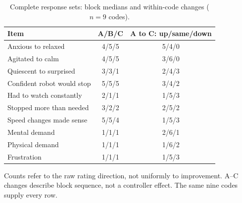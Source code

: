 \begin{table}[t]
\centering
\caption{Complete response sets: block medians and within-code changes ($n=9$ codes).}
\label{tab:survey-sensitivity}
\footnotesize
\begin{tabular}{@{}lcc@{}}
\toprule
Item & A/B/C & A to C: up/same/down \\
\midrule
Anxious to relaxed & 4/5/5 & 5/4/0 \\
Agitated to calm & 4/5/5 & 3/6/0 \\
Quiescent to surprised & 3/3/1 & 2/4/3 \\
Confident robot would stop & 5/5/5 & 3/4/2 \\
Had to watch constantly & 2/1/1 & 1/5/3 \\
Stopped more than needed & 3/2/2 & 2/5/2 \\
Speed changes made sense & 5/5/4 & 1/5/3 \\
Mental demand & 1/1/1 & 2/6/1 \\
Physical demand & 1/1/1 & 1/6/2 \\
Frustration & 1/1/1 & 1/5/3 \\
\bottomrule
\end{tabular}
\par\smallskip\begin{minipage}{\linewidth}\footnotesize Counts refer to the raw rating direction, not uniformly to improvement. A--C changes describe block sequence, not a controller effect. The same nine codes supply every row.\end{minipage}
\end{table}

